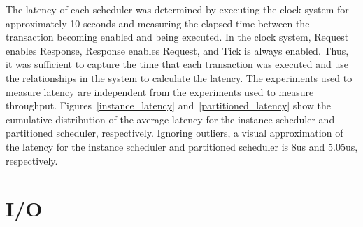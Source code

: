 The latency of each scheduler was determined by executing the clock system for approximately 10 seconds and measuring the elapsed time between the transaction becoming enabled and being executed.
In the clock system, Request enables Response, Response enables Request, and Tick is always enabled.
Thus, it was sufficient to capture the time that each transaction was executed and use the relationships in the system to calculate the latency.
The experiments used to measure latency are independent from the experiments used to measure throughput.
Figures~\ref{instance_latency} and~\ref{partitioned_latency} show the cumulative distribution of the average latency for the instance scheduler and partitioned scheduler, respectively.
Ignoring outliers, a visual approximation of the latency for the instance scheduler and partitioned scheduler is 8us and 5.05us, respectively.



\section{I/O}



